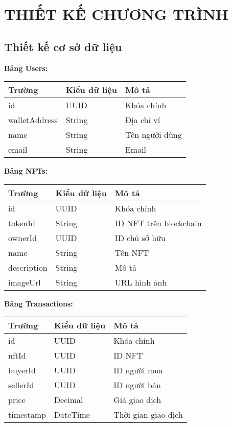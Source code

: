 \chapter{THIẾT KẾ CHƯƠNG TRÌNH}

\section{Thiết kế cơ sở dữ liệu}

\textbf{Bảng Users:}
\begin{center}
\begin{tabular}{|l|l|p{6cm}|}
    \hline
    \textbf{Trường} & \textbf{Kiểu dữ liệu} & \textbf{Mô tả} \\
    \hline
    id & UUID & Khóa chính \\
    \hline
    walletAddress & String & Địa chỉ ví \\
    \hline
    name & String & Tên người dùng \\
    \hline
    email & String & Email \\
    \hline
\end{tabular}
\end{center}

\textbf{Bảng NFTs:}
\begin{center}
\begin{tabular}{|l|l|p{6cm}|}
    \hline
    \textbf{Trường} & \textbf{Kiểu dữ liệu} & \textbf{Mô tả} \\
    \hline
    id & UUID & Khóa chính \\
    \hline
    tokenId & String & ID NFT trên blockchain \\
    \hline
    ownerId & UUID & ID chủ sở hữu \\
    \hline
    name & String & Tên NFT \\
    \hline
    description & String & Mô tả \\
    \hline
    imageUrl & String & URL hình ảnh \\
    \hline
\end{tabular}
\end{center}

\textbf{Bảng Transactions:}
\begin{center}
\begin{tabular}{|l|l|p{6cm}|}
    \hline
    \textbf{Trường} & \textbf{Kiểu dữ liệu} & \textbf{Mô tả} \\
    \hline
    id & UUID & Khóa chính \\
    \hline
    nftId & UUID & ID NFT \\
    \hline
    buyerId & UUID & ID người mua \\
    \hline
    sellerId & UUID & ID người bán \\
    \hline
    price & Decimal & Giá giao dịch \\
    \hline
    timestamp & DateTime & Thời gian giao dịch \\
    \hline
\end{tabular}
\end{center}

